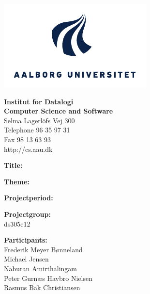 \begin{titlepage}
	\begin{minipage}{0.40\textwidth}
		\includegraphics[width=\textwidth]{Images/aau-logo-new.pdf}
	\end{minipage}
	\hfill
	\begin{minipage}{0.40\textwidth}
		{\sf\small \textbf{Institut for Datalogi}} \\
		{\sf\small \textbf{Computer Science and Software}} \\
		{\sf\small Selma Lagerlöfs Vej 300} \\
		{\sf\small Telephone 96 35 97 31} \\
		{\sf\small Fax 98 13 63 93} \\
		{\sf\small http://cs.aau.dk}
	\end{minipage}

	\begin{minipage}{0.4\textwidth}
		\begin{description}
			\vspace{1cm}
			\item {\bf Title:}\\ \rtitle
			\item {\bf Theme:}\\ \rtheme 
			\item {\bf Projectperiod:}\\ \rperiod
			\item {\bf Projectgroup:}\\ ds305e12
			\item {\bf Participants:}\\
			Frederik Meyer Bønneland\\
			Michael Jensen\\
			Naburan Amirthalingam\\
			Peter Gurnæs Havbro Nielsen\\
			Rasmus Bak Christiansen\\


\end{description}
\end{minipage}
\end{titlepage}

